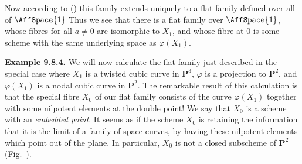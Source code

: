 {Now according to () this family extends uniquely to a flat family defined over all of $\AffSpace{1}$ Thus we see that there is a flat family over $\AffSpace{1}$, whose fibres for all $a\ne0$ are isomorphic to $X_1$, and whose fibre at $0$ is some scheme with the same underlying space as $\varphi(X_1)$.

\medskip
\noindent\hypertarget{result-III-9.8.4}{}\textbf{Example 9.8.4.} \EditionText{}We will now calculate the flat family just described in the special case where $X_1$ is a twisted cubic curve in $\mathbf P^3$, $\varphi$ is a projection to $\mathbf P^2$, and $\varphi(X_1)$ is a nodal cubic curve in $\mathbf P^2$. The remarkable result of this calculation is that the special fibre $X_0$ of our flat family consists of the curve $\varphi(X_1)$ together with some nilpotent elements at the double point! We say that $X_0$ is a scheme with an \emph{embedded point}. It seems as if the scheme $X_0$ is retaining the information that it is the limit of a family of space curves, by having these nilpotent elements which point out of the plane. In particular, $X_0$ is not a closed subscheme of $\mathbf P^2$ (Fig.~).}
